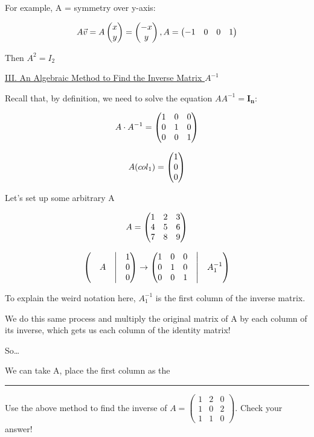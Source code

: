 \documentclass[11pt]{article}      %
\begin{document}
For example, A = symmetry over y-axis:

\[A\vec{v} = A \begin{pmatrix} x\\y \end{pmatrix}  =  \begin{pmatrix} -x\\y \end{pmatrix} , A =  \begin{pmatrix} -1&0&0&1 \end{pmatrix} \]

Then $A^2 = I_2$

\pagebreak

\begin{center}
\underline{III. An Algebraic Method to Find the Inverse Matrix $A^{-1}$}
\end{center}

Recall that, by definition, we need to solve the equation $A A^{-1}=\mathbf{I_n}$:

\[A \cdot A^{-1} =  \begin{pmatrix} 1&0&0\\0&1&0\\0&0&1 \end{pmatrix} \]

\[A(col_1) =  \begin{pmatrix} 1\\0\\0 \end{pmatrix} \]

Let's set up some arbitrary A

\[A =  \begin{pmatrix} 1&2&3\\4&5&6\\7&8&9 \end{pmatrix} \]

\[
	 \begin{pmatrix} 
		&&\bigm|&1\\
		&A&\bigm|&0\\
		&&\bigm|&0		
	 \end{pmatrix} 
	\to
	 \begin{pmatrix} 
		1&0&0&\bigm|&\\
		0&1&0&\bigm|&A^{-1}_1\\
		0&0&1&\bigm|&		
	 \end{pmatrix} 
\]

To explain the weird notation here, $A^{-1}_1$ is the first column of the inverse matrix. 

We do this same process and multiply the original matrix of A by each column of its inverse, which gets us each column of the identity matrix!

So\ldots

We can take A, place the first column as the 

\vfill
\hrule
\begin{example}
Use the above method to find the inverse of $A=\left( \begin{array}{ccc}
1 & 2&0\\
1 & 0& 2 \\
1& 1 &0
\end{array} \right)$. Check your answer!
\end{example}
\vfill

\pagebreak
\end{document}
